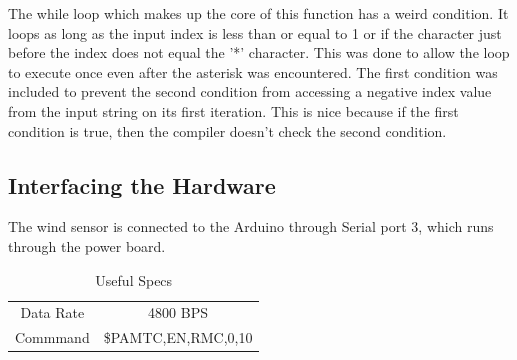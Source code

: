 \documentclass[letterpaper]{article}
\begin{document}
The while loop which makes up the core of this function has a weird condition. It loops as long as the input index is less than or equal to 1 or if the character just before the index does not equal the '*' character. This was done to allow the loop to execute once even after the asterisk was encountered. The first condition was included to prevent the second condition from accessing a negative index value from the input string on its first iteration. This is nice because if the first condition is true, then the compiler doesn't check the second condition.


\subsection{Interfacing the Hardware} %
\label{sub:Interfacing the Hardware}

The wind sensor is connected to the Arduino through Serial port 3, which runs through the power board.

\begin{table}[h]
	\centering
	\begin{tabular}{c|c}
		\hline
		Data Rate 	& 	4800 BPS 	\\
		Commmand 	& 	\$PAMTC,EN,RMC,0,10 \\
	\end{tabular}
	\caption{Useful Specs}
	\label{tbl:windspecs}
\end{table}


\end{document}

